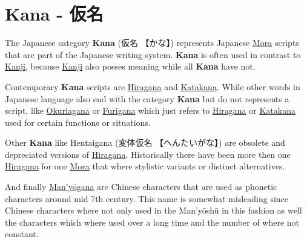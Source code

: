 \section{Kana - 仮名} \label{sec:Kana}

The Japanese category \textbf{Kana} ({仮名} {【かな】}) represents Japanese
\hyperref[sec:Mora]{Mora} scripts that are part of the Japanese writing
system. \textbf{Kana} is often used in contrast to
\hyperref[sec:Kanji]{Kanji}, because \hyperref[sec:Kanji]{Kanji} also posses
meaning while all \textbf{Kana} have not. 

Contemporary \textbf{Kana} scripts are \hyperref[sec:Hiragana]{Hiragana} and
\hyperref[sec:Katakana]{Katakana}. While other words in Japanese language also
end with the category \textbf{Kana} but do not represents a script, like
\hyperref[sec:Okurigana]{Okuriagana} or \hyperref[sec:Furigana]{Furigana}
which just refers to \hyperref[sec:Hiragana]{Hiragana} or
\hyperref[sec:Katakana]{Katakana} used for certain functions or situations.  

Other \textbf{Kana} like Hentaigana ({変体仮名} {【へんたいがな】}) are
obsolete and depreciated versions of \hyperref[sec:Hiragana]{Hiragana}.
Historically  there have been more then one \hyperref[sec:Hiragana]{Hiragana}
for one \hyperref[sec:Mora]{Mora} that where stylistic variants or distinct
alternatives.

And finally \hyperref[sec:Monyogana]{Man'yōgana} are Chinese characters that
are used as phonetic characters around mid 7th century. This name is somewhat
misleading since Chinese characters where not only used in the Man'yōshū in
this fashion as well the characters which where used over a long time and the
number of where not constant.


